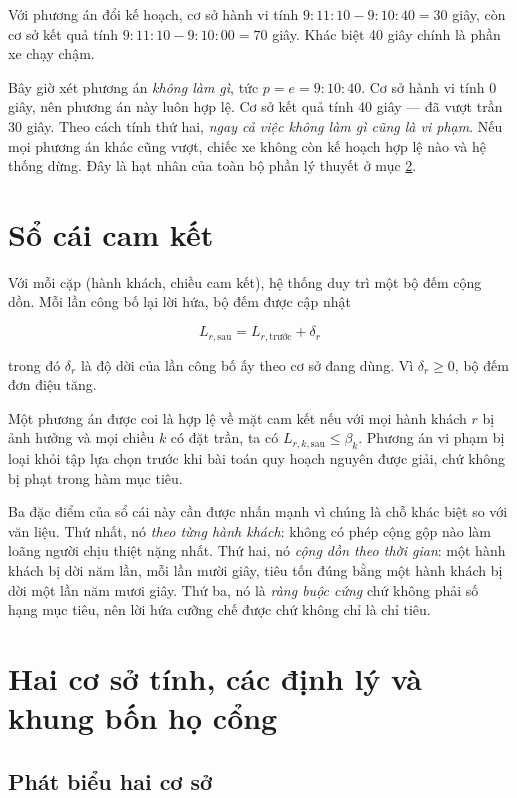 Với phương án đổi kế hoạch, cơ sở hành vi tính $9{:}11{:}10 - 9{:}10{:}40 = 30$ giây, còn cơ sở
kết quả tính $9{:}11{:}10 - 9{:}10{:}00 = 70$ giây. Khác biệt 40 giây chính là phần xe chạy chậm.

Bây giờ xét phương án \emph{không làm gì}, tức $p = e = 9{:}10{:}40$. Cơ sở hành vi tính 0 giây,
nên phương án này luôn hợp lệ. Cơ sở kết quả tính 40 giây --- đã vượt trần 30 giây. Theo cách
tính thứ hai, \emph{ngay cả việc không làm gì cũng là vi phạm}. Nếu mọi phương án khác cũng vượt,
chiếc xe không còn kế hoạch hợp lệ nào và hệ thống dừng. Đây là hạt nhân của toàn bộ phần lý
thuyết ở mục \ref{muc:haicosotinh}.

\section{Sổ cái cam kết}

Với mỗi cặp (hành khách, chiều cam kết), hệ thống duy trì một bộ đếm cộng dồn. Mỗi lần công bố
lại lời hứa, bộ đếm được cập nhật

\begin{equation}
L_{r,\text{sau}} = L_{r,\text{trước}} + \delta_r
\end{equation}

trong đó $\delta_r$ là độ dời của lần công bố ấy theo cơ sở đang dùng. Vì $\delta_r \ge 0$, bộ
đếm đơn điệu tăng.

Một phương án được coi là hợp lệ về mặt cam kết nếu với mọi hành khách $r$ bị ảnh hưởng và mọi
chiều $k$ có đặt trần, ta có $L_{r,k,\text{sau}} \le \beta_k$. Phương án vi phạm bị loại khỏi
tập lựa chọn trước khi bài toán quy hoạch nguyên được giải, chứ không bị phạt trong hàm mục
tiêu.

Ba đặc điểm của sổ cái này cần được nhấn mạnh vì chúng là chỗ khác biệt so với văn liệu. Thứ
nhất, nó \emph{theo từng hành khách}: không có phép cộng gộp nào làm loãng người chịu thiệt
nặng nhất. Thứ hai, nó \emph{cộng dồn theo thời gian}: một hành khách bị dời năm lần, mỗi lần
mười giây, tiêu tốn đúng bằng một hành khách bị dời một lần năm mươi giây. Thứ ba, nó là
\emph{ràng buộc cứng} chứ không phải số hạng mục tiêu, nên lời hứa cưỡng chế được chứ không
chỉ là chỉ tiêu.

\section{Hai cơ sở tính, các định lý và khung bốn họ cổng}
\label{muc:haicosotinh}

\subsection{Phát biểu hai cơ sở}

